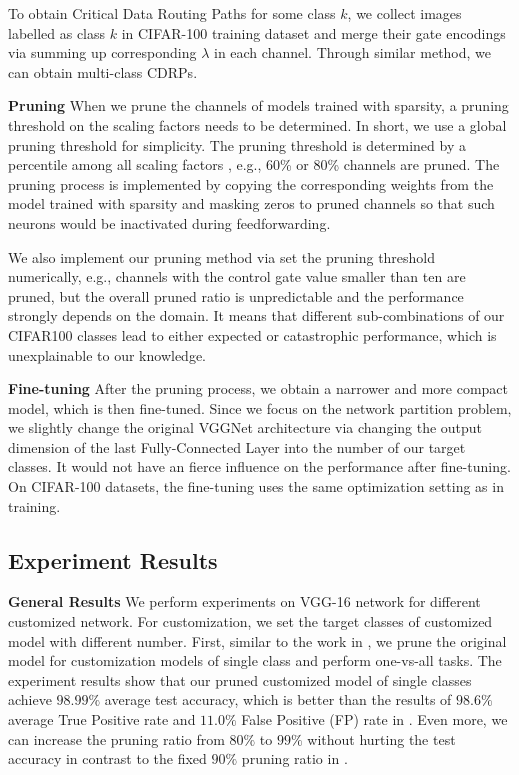 \documentclass[conference]{IEEEtran}
\begin{document}
To obtain Critical Data Routing Paths for some class $k$, we collect images labelled as class $k$ in CIFAR-100 training dataset and merge their gate encodings via summing up corresponding $\lambda$ in each channel. Through similar method, we can obtain multi-class CDRPs.

\textbf{Pruning} \; When we prune the channels of models trained with sparsity, a pruning threshold on the scaling factors needs to be determined. In short, we use a global pruning threshold for simplicity. The pruning threshold is determined by a percentile among all scaling factors , e.g., 60\% or 80\% channels are pruned. The pruning process is implemented by copying the corresponding weights from the model trained with sparsity and masking zeros to pruned channels so that such neurons would be inactivated during feedforwarding.

We also implement our pruning method via set the pruning threshold numerically, e.g., channels with the control gate value smaller than ten are pruned, but the overall pruned ratio is unpredictable and the performance strongly depends on the domain. It means that different sub-combinations of our CIFAR100 classes lead to either expected or catastrophic performance, which is unexplainable to our knowledge.

\textbf{Fine-tuning} \; After the pruning process, we obtain a narrower and more compact model, which is then fine-tuned. Since we focus on the network partition problem, we slightly change the original VGGNet architecture via changing the output dimension of the last Fully-Connected Layer into the number of our target classes. It would not have an fierce influence on the performance after fine-tuning. On CIFAR-100 datasets, the fine-tuning uses the same optimization setting as in training.

\subsection{Experiment Results}

\textbf{General Results} \; We perform experiments on VGG-16 network for different customized network. For customization, we set the target classes of customized model with different number. First, similar to the work in \cite{yu2018distilling}, we prune the original model for   customization models of single class and perform one-vs-all tasks. The experiment results show that our pruned customized model of single classes achieve $98.99\%$ average test accuracy, which is better than the results of $98.6\%$ average True Positive rate and $11.0\%$ False Positive (FP) rate  in \cite{yu2018distilling}. Even more, we can increase the pruning ratio from $80\%$ to $99\%$ without hurting the test accuracy in contrast to the fixed $90\%$ pruning ratio in \cite{yu2018distilling}.
\end{document}
